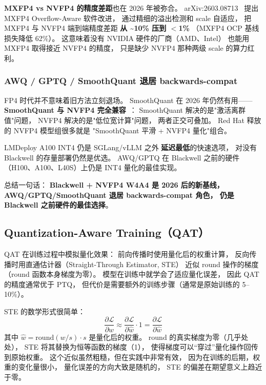 \textbf{MXFP4 vs NVFP4 的精度差距}也在 2026 年被弥合。
arXiv:2603.08713~\cite{mxfp4overflow2026}
提出 MXFP4 Overflow-Aware 软件改进，
通过精细的溢出检测和 scale 自适应，
把 MXFP4 与 NVFP4 端到端精度差距
\textbf{从 \textasciitilde{}10\% 压到 $<$1\%}
（MXFP4 OCP 基线损失降低 62\%）。
这意味着没有 NVIDIA 硬件的厂商（AMD、Intel）
也能用 MXFP4 取得接近 NVFP4 的精度，
只是缺少 NVFP4 那种两级 scale 的算力红利。

\subsubsection{AWQ / GPTQ / SmoothQuant 退居 backwards-compat}

FP4 时代并不意味着旧方法立刻退场。
SmoothQuant 在 2026 年仍然有用——
\textbf{SmoothQuant 与 NVFP4 完全兼容}~\cite{redhatNvfp42026}：
SmoothQuant 解决的是"激活离群值"问题，
NVFP4 解决的是"低位宽计算"问题，
两者正交可叠加。
Red Hat 释放的 NVFP4 模型组很多就是
"SmoothQuant 平滑 + NVFP4 量化"组合。

LMDeploy A100 INT4 仍是 SGLang/vLLM 之外
\textbf{延迟最低}的快速选项，
对没有 Blackwell 的存量部署仍然是优选。
AWQ/GPTQ 在 Blackwell 之前的硬件
（H100、A100、L40S）上仍是 INT4 量化的最佳实现。

总结一句话：
\textbf{Blackwell + NVFP4 W4A4 是 2026 后的新基线，
AWQ/GPTQ/SmoothQuant 退居 backwards-compat 角色，
仍是 Blackwell 之前硬件的最佳选择}。

\subsection{Quantization-Aware Training（QAT）}

QAT 在训练过程中模拟量化效果：
前向传播时使用量化后的权重计算，
反向传播时用直通估计器（Straight-Through Estimator, STE）
近似 round 操作的梯度（round 函数本身梯度为零）。
模型在训练中就学会了适应量化误差，
因此 QAT 的精度通常优于 PTQ，
但代价是需要额外的训练步骤（通常是原始训练的 5--10\%）。

STE 的数学形式很简单：
\begin{equation}
  \frac{\partial \mathcal{L}}{\partial w} \approx
  \frac{\partial \mathcal{L}}{\partial \hat{w}} \cdot 1
  = \frac{\partial \mathcal{L}}{\partial \hat{w}}
\end{equation}
其中 $\hat{w} = \mathrm{round}(w/s) \cdot s$ 是量化后的权重。
$\mathrm{round}$ 的真实梯度为零（几乎处处），
STE 将其替换为恒等函数的梯度（1），
使得梯度可以“穿过”量化操作回传到原始权重。
这个近似虽然粗糙，但在实践中非常有效，
因为在训练的后期，权重的变化量很小，
量化误差的方向大致是随机的，
STE 的偏差在期望意义上趋近于零。

